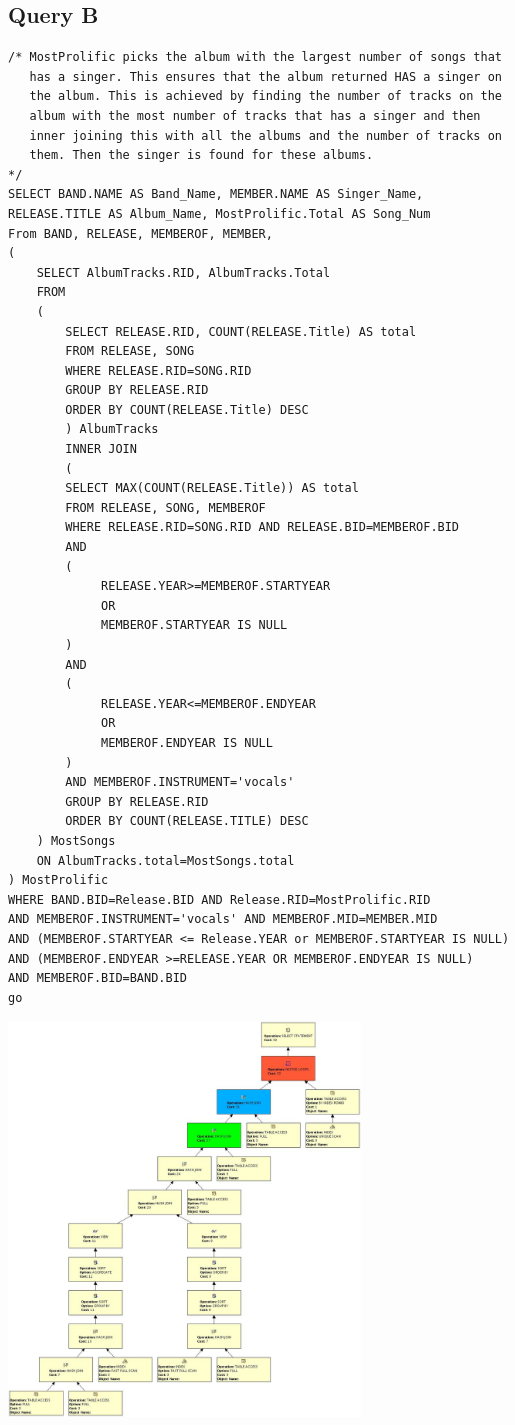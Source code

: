 \documentclass{report}
\begin{document}
\subsection*{Query B}
\begin{verbatim}
/* MostProlific picks the album with the largest number of songs that
   has a singer. This ensures that the album returned HAS a singer on
   the album. This is achieved by finding the number of tracks on the
   album with the most number of tracks that has a singer and then
   inner joining this with all the albums and the number of tracks on
   them. Then the singer is found for these albums.
*/
SELECT BAND.NAME AS Band_Name, MEMBER.NAME AS Singer_Name,
RELEASE.TITLE AS Album_Name, MostProlific.Total AS Song_Num
From BAND, RELEASE, MEMBEROF, MEMBER, 
(
    SELECT AlbumTracks.RID, AlbumTracks.Total
    FROM 
    (
        SELECT RELEASE.RID, COUNT(RELEASE.Title) AS total
        FROM RELEASE, SONG
        WHERE RELEASE.RID=SONG.RID 
        GROUP BY RELEASE.RID
        ORDER BY COUNT(RELEASE.Title) DESC
        ) AlbumTracks 
        INNER JOIN 
        (
        SELECT MAX(COUNT(RELEASE.Title)) AS total
        FROM RELEASE, SONG, MEMBEROF
        WHERE RELEASE.RID=SONG.RID AND RELEASE.BID=MEMBEROF.BID 
        AND 
        (   
             RELEASE.YEAR>=MEMBEROF.STARTYEAR 
             OR 
             MEMBEROF.STARTYEAR IS NULL
        )
        AND 
        (
             RELEASE.YEAR<=MEMBEROF.ENDYEAR 
             OR 
             MEMBEROF.ENDYEAR IS NULL
        ) 
        AND MEMBEROF.INSTRUMENT='vocals'
        GROUP BY RELEASE.RID
        ORDER BY COUNT(RELEASE.TITLE) DESC
    ) MostSongs
    ON AlbumTracks.total=MostSongs.total
) MostProlific
WHERE BAND.BID=Release.BID AND Release.RID=MostProlific.RID 
AND MEMBEROF.INSTRUMENT='vocals' AND MEMBEROF.MID=MEMBER.MID
AND (MEMBEROF.STARTYEAR <= Release.YEAR or MEMBEROF.STARTYEAR IS NULL)
AND (MEMBEROF.ENDYEAR >=RELEASE.YEAR OR MEMBEROF.ENDYEAR IS NULL) 
AND MEMBEROF.BID=BAND.BID
go
\end{verbatim}
\includegraphics[width=0.7\textwidth]{Q5B}
\end{document}
